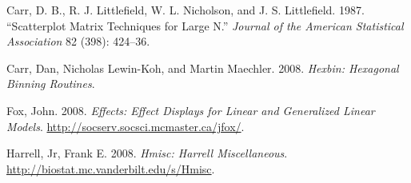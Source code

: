 Carr, D. B., R. J. Littlefield, W. L. Nicholson, and J. S. Littlefield.
1987. ``Scatterplot Matrix Techniques for Large N.'' \emph{Journal of
the American Statistical Association} 82 (398): 424--36.

Carr, Dan, Nicholas Lewin-Koh, and Martin Maechler. 2008. \emph{Hexbin:
Hexagonal Binning Routines}.

Fox, John. 2008. \emph{Effects: Effect Displays for Linear and
Generalized Linear Models}.
\url{http://socserv.socsci.mcmaster.ca/jfox/}.

Harrell, Jr, Frank E. 2008. \emph{Hmisc: Harrell Miscellaneous}.
\url{http://biostat.mc.vanderbilt.edu/s/Hmisc}.
